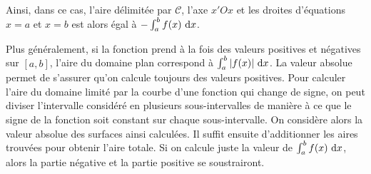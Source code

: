       Ainsi, dans ce cas, l'aire d\'elimit\'ee par $\mathscr{C}$, l'axe $x'Ox$ et les droites d'\'equations $x=a$ et $x=b$
      est alors \'egal \`a {$-\int_{a}^{b} f(x) ~\mathrm{d}x$}.
      
      Plus g\'en\'eralement, si la fonction prend \`a la fois des valeurs positives et n\'egatives sur $[a,b]$,
      l'aire du domaine plan correspond \`a $\int_{a}^{b} |f(x)| ~\mathrm{d}x$.
      La valeur absolue permet de s'assurer qu'on calcule toujours des valeurs positives.
      Pour calculer l'aire du domaine limit\'e par la courbe d'une fonction qui change de signe,
      on peut diviser l'intervalle consid\'er\'e en plusieurs sous-intervalles
      de mani\`ere \`a ce que le signe de la fonction soit constant sur chaque sous-intervalle.
      On consid\`ere alors la valeur absolue des surfaces ainsi calcul\'ees.
      Il suffit ensuite d'additionner les aires trouv\'ees pour obtenir l'aire totale.
      Si on calcule juste la valeur de $\int_{a}^{b} f(x) ~\mathrm{d}x$, alors 
      la partie n\'egative et la partie positive se soustrairont.
